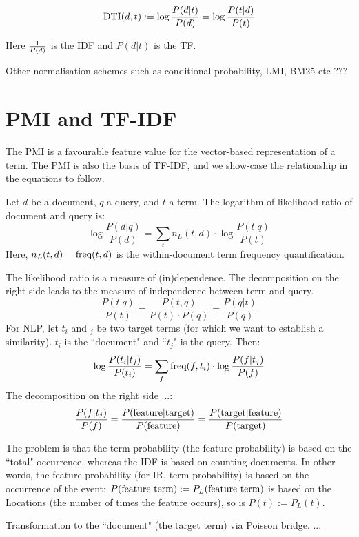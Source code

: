 \begin{equation}
\label{independence}
\textmd{DTI}(d,t) := \log\frac{P(d | t)}{P(d)} = \log\frac{P(t|d)}{P(t)}
\end{equation}


Here  ${1} \over {P(d)}$ is the IDF and  $P(d| t)$ is the TF. 





Other normalisation schemes such as conditional probability, LMI, BM25 etc ???



\section{PMI and TF-IDF}

The PMI is a favourable feature value for the vector-based representation
of a term.
The PMI is also the basis of TF-IDF, and we show-case the relationship
in the equations to follow.

Let $d$ be a document, $q$ a query, and $t$ a term.
The logarithm of likelihood ratio of document and query is:
\[
\log\frac{P(d|q)}{P(d)} =
	\sum_t n_L(t,d) \cdot \log\frac{P(t|q)}{P(t)}
\]
Here, $n_L(t,d)=\textmd{freq}(t,d)$ is the within-document term frequency
quantification.

The likelihood ratio is a measure of (in)dependence.
The decomposition on the right side leads to the measure of independence
between term and query.
\[
\frac{P(t|q)}{P(t)} = \frac{P(t,q)}{P(t) \cdot P(q)} = \frac{P(q|t)}{P(q)}
\]
For NLP, let $t_i$ and $_j$ be two target terms
(for which we want to establish a similarity).
$t_i$ is the ``document" and ``$t_j$" is the query.
Then:
\[
\log\frac{P(t_i|t_j)}{P(t_i)} =
	\sum_f \textmd{freq}(f,t_i) \cdot \log\frac{P(f|t_j)}{P(f)}
\]
The decomposition on the right side ...:
\[
\frac{P(f|t_j)}{P(f)} =
\frac{P(\textmd{feature}|\textmd{target})}{P(\textmd{feature})} =
\frac{P(\textmd{target}|\textmd{feature})}{P(\textmd{target})}
\]

The problem is that the term probability (the feature probability)
is based on the ``total" occurrence, whereas the IDF is based
on counting documents.
In other words,
the feature probability (for IR, term probability) is based on
the occurrence of the event:
$P(\textmd{feature term}):=P_L(\textmd{feature term})$
is based on the Locations (the number of times the feature occurs), so is
$P(t):=P_L(t)$.

Transformation to the ``document" (the target term) via Poisson bridge.
...

